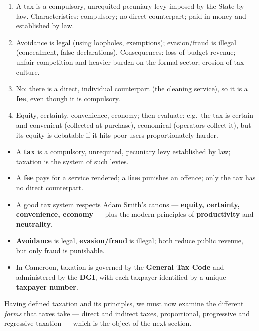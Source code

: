 \documentclass[11pt]{article}
\begin{document}
\begin{corrige}
\begin{enumerate}
\item A tax is a compulsory, unrequited pecuniary levy imposed by the State by law. Characteristics: compulsory; no direct counterpart; paid in money and established by law.
\item Avoidance is legal (using loopholes, exemptions); evasion/fraud is illegal (concealment, false declarations). Consequences: loss of budget revenue; unfair competition and heavier burden on the formal sector; erosion of tax culture.
\item No: there is a direct, individual counterpart (the cleaning service), so it is a \textbf{fee}, even though it is compulsory.
\item Equity, certainty, convenience, economy; then evaluate: e.g.\ the tax is certain and convenient (collected at purchase), economical (operators collect it), but its equity is debatable if it hits poor users proportionately harder.
\end{enumerate}
\end{corrige}

\begin{aretenir}
\begin{itemize}
\item A \textbf{tax} is a compulsory, unrequited, pecuniary levy established by law; taxation is the system of such levies.
\item A \textbf{fee} pays for a service rendered; a \textbf{fine} punishes an offence; only the tax has no direct counterpart.
\item A good tax system respects Adam Smith's canons — \textbf{equity, certainty, convenience, economy} — plus the modern principles of \textbf{productivity} and \textbf{neutrality}.
\item \textbf{Avoidance} is legal, \textbf{evasion/fraud} is illegal; both reduce public revenue, but only fraud is punishable.
\item In Cameroon, taxation is governed by the \textbf{General Tax Code} and administered by the \textbf{DGI}, with each taxpayer identified by a unique \textbf{taxpayer number}.
\end{itemize}
\end{aretenir}

Having defined taxation and its principles, we must now examine the different \emph{forms} that taxes take — direct and indirect taxes, proportional, progressive and regressive taxation — which is the object of the next section.
\end{document}
